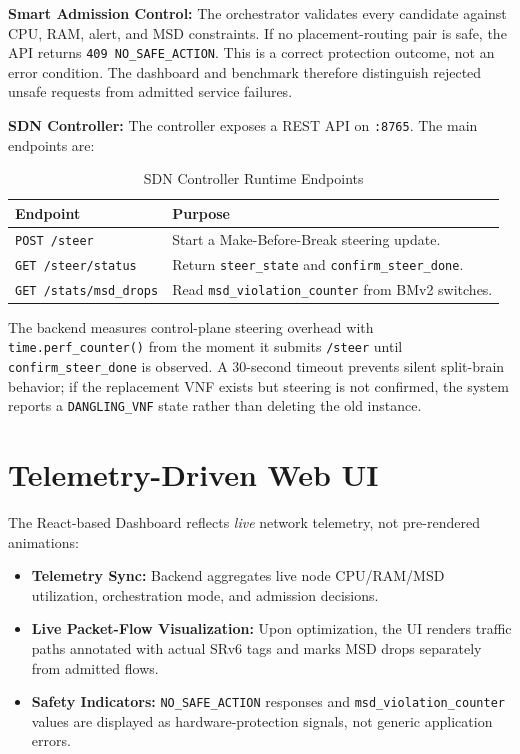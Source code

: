 \documentclass[12pt, a4paper, reqno, oneside]{book}
\begin{document}
\textbf{Smart Admission Control:} The orchestrator validates every candidate against CPU, RAM, alert, and MSD constraints. If no placement-routing pair is safe, the API returns \texttt{409 NO\_SAFE\_ACTION}. This is a correct protection outcome, not an error condition. The dashboard and benchmark therefore distinguish rejected unsafe requests from admitted service failures.

\textbf{SDN Controller:} The controller exposes a REST API on \texttt{:8765}. The main endpoints are:

\begin{table}[H]
\centering
\caption{SDN Controller Runtime Endpoints}
\label{table:sdn_endpoints}
\begin{tabular}{ll}
\toprule
\textbf{Endpoint} & \textbf{Purpose} \\
\midrule
\texttt{POST /steer} & Start a Make-Before-Break steering update. \\
\texttt{GET /steer/status} & Return \texttt{steer\_state} and \texttt{confirm\_steer\_done}. \\
\texttt{GET /stats/msd\_drops} & Read \texttt{msd\_violation\_counter} from BMv2 switches. \\
\bottomrule
\end{tabular}
\end{table}

The backend measures control-plane steering overhead with \texttt{time.perf\_counter()} from the moment it submits \texttt{/steer} until \texttt{confirm\_steer\_done} is observed. A 30-second timeout prevents silent split-brain behavior; if the replacement VNF exists but steering is not confirmed, the system reports a \texttt{DANGLING\_VNF} state rather than deleting the old instance.

\section{Telemetry-Driven Web UI}
The React-based Dashboard reflects \textit{live} network telemetry, not pre-rendered animations:
\begin{itemize}
    \item \textbf{Telemetry Sync:} Backend aggregates live node CPU/RAM/MSD utilization, orchestration mode, and admission decisions.
    \item \textbf{Live Packet-Flow Visualization:} Upon optimization, the UI renders traffic paths annotated with actual SRv6 tags and marks MSD drops separately from admitted flows.
    \item \textbf{Safety Indicators:} \texttt{NO\_SAFE\_ACTION} responses and \texttt{msd\_violation\_counter} values are displayed as hardware-protection signals, not generic application errors.
\end{itemize}
\end{document}
